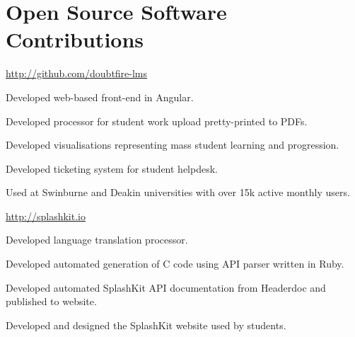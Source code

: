 \section{Open Source Software Contributions}

\begin{multicols}{2}

{}
{
}
{\href{http://github.com/doubtfire-lms}{http://github.com/doubtfire-lms}}
{
  \item Developed web-based front-end in Angular.
  \item Developed processor for student work upload pretty-printed to PDFs.
  \item Developed visualisations representing mass student learning and progression.
  \item Developed ticketing system for student helpdesk.
  \item Used at Swinburne and Deakin universities with over 15k active monthly users.
}

\columnbreak

{}
{
}
{\href{http://splashkit.io}{http://splashkit.io}}
{
  \item Developed language translation processor.
  \item Developed automated generation of C code using API parser written in Ruby.
  \item Developed automated SplashKit API documentation from Headerdoc and published to website.
  \item Developed and designed the SplashKit website used by students.
}
\hfill

\end{multicols}